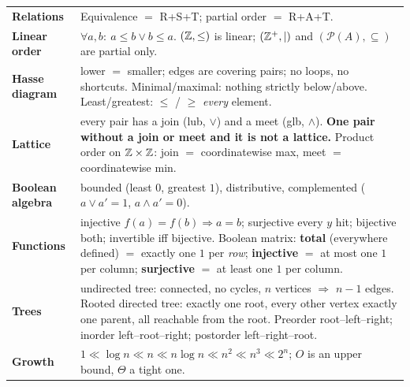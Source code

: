 \documentclass{fkt-notes}
\theoremstyle{definition}
\begin{document}
\begin{rulepar}
  \begin{tabular}{@{}p{}p{}@{}}
    \textbf{Relations}       & Equivalence $=$ R+S+T; partial order $=$ R+A+T.                                                                                                                                                                                                                                                           \\
    \textbf{Linear order}    & $\forall a,b:\ a\le b\vee b\le a$. $(\mathbb{Z},\le)$ is linear; $(\mathbb{Z}^+,\mid)$ and $(\mathcal P(A),\subseteq)$ are partial only.                                                                                                                                                                                  \\
    \textbf{Hasse diagram}   & lower $=$ smaller; edges are covering pairs; no loops, no shortcuts. Minimal/maximal: nothing strictly below/above. Least/greatest: $\le$ / $\ge$ \emph{every} element.                                                                                                                                   \\
    \textbf{Lattice}         & every pair has a join (lub, $\vee$) and a meet (glb, $\wedge$). \textbf{One pair without a join or meet and it is not a lattice.} Product order on $\mathbb{Z}\times\mathbb{Z}$: join $=$ coordinatewise max, meet $=$ coordinatewise min.                                                                                \\
    \textbf{Boolean algebra} & bounded (least $0$, greatest $1$), distributive, complemented ($a\vee a'=1$, $a\wedge a'=0$).                                                                                                                                                                                                             \\
    \textbf{Functions}       & injective $f(a)=f(b)\Rightarrow a=b$; surjective every $y$ hit; bijective both; invertible iff bijective. Boolean matrix: \textbf{total} (everywhere defined) $=$ exactly one $1$ per \emph{row}; \textbf{injective} $=$ at most one $1$ per column; \textbf{surjective} $=$ at least one $1$ per column. \\
    \textbf{Trees}           & undirected tree: connected, no cycles, $n$ vertices $\Rightarrow$ $n-1$ edges. Rooted directed tree: exactly one root, every other vertex exactly one parent, all reachable from the root. Preorder root--left--right; inorder left--root--right; postorder left--right--root.                            \\
    \textbf{Growth}          & $1\ll\log n\ll n\ll n\log n\ll n^2\ll n^3\ll2^n$; $O$ is an upper bound, $\Theta$ a tight one.                                                                                                                                                                                                            \\
  \end{tabular}
\end{rulepar}
\end{document}
